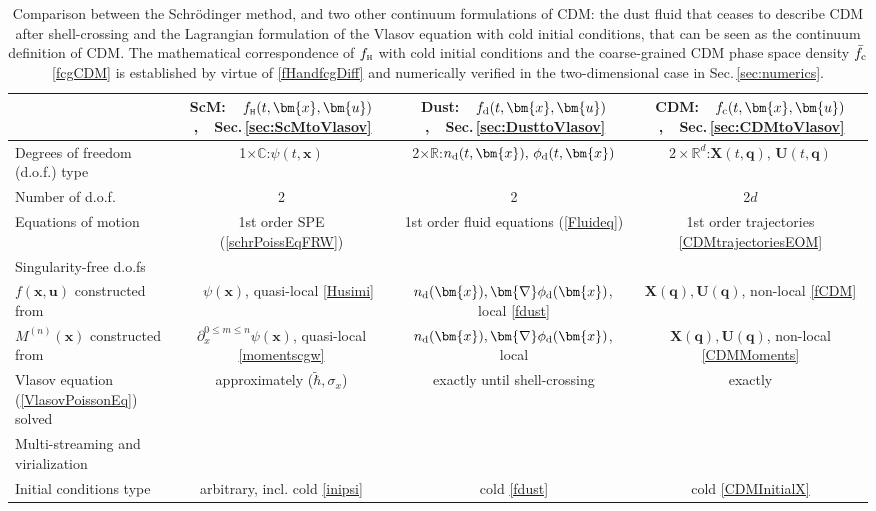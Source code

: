 \documentclass[twocolumn, nofootinbib, showpacs, superscriptaddress]{revtex4-1}
\renewcommand{\H}[0]{{\textsc{h}}}
\newcommand{\cmark}{\ding{51}}%
\newcommand{\xmark}{\ding{55}}%
\newcommand{\sigx}{{\sigma_{\! x}}}
\newcommand{\thbar}{\tilde\hbar}
\renewcommand{\d}[0]{{\rm{d}}}
\renewcommand{\c}[0]{{\rm{c}}}
\newcommand{\vx}[0]{\bm{x} }
\newcommand{\vX}[0]{\bm{X} }
\newcommand{\vq}[0]{\bm{q} }
\newcommand{\vu}[0]{\bm{u} }
\newcommand{\vU}[0]{\bm{U} }
\newcommand{\vnabla}[0]{\bm{\nabla} }
\begin{document}
\begin{table*}
\centering
\begin{tabular}{|l|c|c|c|}
\hline
 & ScM:\ \ $f_\H(t, \vx,\vu)$\,,\ \ Sec.\,\ref{sec:ScMtoVlasov} & Dust:\ \ $f_\d(t, \vx,\vu)$\,,\ \ Sec.\,\ref{sec:DusttoVlasov}    & CDM:\ \  $f_{\rm c}(t,\vx,\vu)$\,,\ \  Sec.\,\ref{sec:CDMtoVlasov}\\\hline
 Degrees of freedom (d.o.f.) type & 1$\times\mathbb C$:\quad $\psi(t,\vx)$ &2$\times\mathbb R$:\quad $n_\d(t,\vx),\, \phi_\d(t,\vx)$ &$2\times\mathbb R^d$:\quad $\vX(t,\vq),\, \vU(t,\vq)$\\
  Number of d.o.f. & 2 &2 &2$d$\\
Equations of motion & 1st order SPE (\ref{schrPoissEqFRW}) & 1st order fluid equations (\ref{Fluideq}) & 1st order trajectories \eqref{CDMtrajectoriesEOM}\\
Singularity-free d.o.fs  & \cmark & \xmark & \cmark \\
$f(\vx,\vu)$ constructed from & \qquad \  \ $\psi(\vx)$, quasi-local \eqref{Husimi}  & $n_\d(\vx), \vnabla\phi_\d(\vx)$,\, local \eqref{fdust}& $\vX(\vq), \vU(\vq)$, non-local \eqref{fCDM} \\
$M^{(n)}(\vx)$ constructed from & $\partial^{0\leq m \leq n}_x \psi(\vx)$, quasi-local \eqref{momentscgw}  & $n_\d(\vx), \vnabla\phi_\d(\vx)$,\, local \phantom{blab} & $\vX(\vq), \vU(\vq)$, non-local \eqref{CDMMoments} \\
Vlasov equation (\ref{VlasovPoissonEq}) solved & approximately ($\thbar,\sigx$) &  exactly until shell-crossing &  exactly\\
Multi-streaming and virialization & \cmark & \xmark  & \cmark\\
 Initial conditions type & arbitrary, incl. cold \eqref{inipsi} & cold \eqref{fdust} &  cold \eqref{CDMInitialX}  \\\hline
\end{tabular}
\caption{Comparison between the Schr\"odinger method, and two other continuum formulations of CDM: the dust fluid that ceases to describe CDM after shell-crossing and the Lagrangian formulation of the Vlasov equation with cold initial conditions, that can be seen as the continuum definition of CDM. The mathematical correspondence of $f_\H$ with cold initial conditions and the coarse-grained CDM phase space density $\bar f_\c$ \eqref{fcgCDM} is established by virtue of \eqref{fHandfcgDiff} and numerically verified in the two-dimensional case in Sec.\,\ref{sec:numerics}.}
\label{tab:tabScM}
\end{table*}
\end{document}
